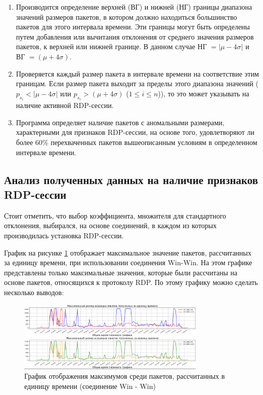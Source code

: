 \documentclass[bachelor, och, coursework]{SCWorks}
\begin{document}
\begin{enumerate}
  \item Производится определение верхней (ВГ) и нижней (НГ) границы диапазона значений размеров пакетов, в котором должно находиться 
  большинство пакетов для этого интервала времени. Эти границы могут быть определены путем добавления или вычитания отклонения 
  от среднего значения размеров пакетов, к верхней или нижней границе. В данном случае  НГ $= |\mu - 4\sigma|$ и ВГ $= (\mu + 4\sigma)$.
  \item Проверяется каждый размер пакета в интервале времени на соответствие этим границам. 
  Если размер пакета выходит за пределы этого диапазона значений ($p_{s_i} < |\mu - 4\sigma|$ или $p_{s_i} > (\mu + 4\sigma)$ ($1 \leq i \leq n$)), 
  то это может указывать на наличие активной RDP-сессии.
  \item Программа определяет наличие пакетов с аномальными размерами, характерными для признаков RDP-сессии, на основе того, удовлетворяют ли более 60\% 
  перехваченных пакетов вышеописанным условиям в определенном интервале времени.
\end{enumerate}

\subsection{Анализ полученных данных на наличие признаков RDP-сессии}

Стоит отметить, что выбор коэффициента, множителя для стандартного отклонения, выбирался, на основе соединений, в каждом из которых производилась 
установка RDP-сессии.

График на рисунке \ref{win-size} отображает максимальное значение пакетов, рассчитанных за единицу времени, при использовании соединения Win-Win. 
На этом графике представлены только максимальные значения, которые были рассчитаны на основе пакетов, относящихся к протоколу RDP. По этому 
графику можно сделать несколько выводов:


\begin{figure}[H]
  \centering
  \includegraphics[width=0.8\textwidth]{photo/size-win.png}
  \caption{График отображения максимумов среди пакетов, рассчитанных в единицу времени (соединение Win - Win)}
  \label{win-size}
\end{figure}
\end{document}
